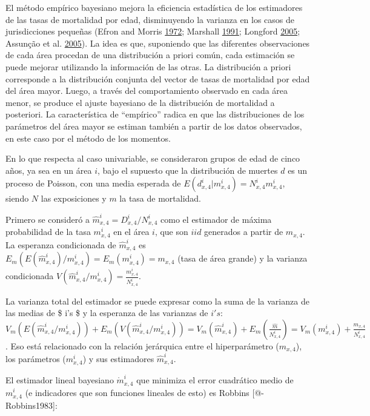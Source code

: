 \documentclass[12pt,]{article}
\begin{document}
El método empírico bayesiano mejora la eficiencia estadística de los
estimadores de las tasas de mortalidad por edad, disminuyendo la
varianza en los casos de jurisdicciones pequeñas (Efron and Morris
\protect\hyperlink{ref-Efron1972}{1972}; Marshall
\protect\hyperlink{ref-Marshall1991}{1991}; Longford
\protect\hyperlink{ref-Longford2005}{2005}; Assunção et al.
\protect\hyperlink{ref-Assuncao2005}{2005}). La idea es que, suponiendo
que las diferentes observaciones de cada área procedan de una
distribución a priori común, cada estimación se puede mejorar utilizando
la información de las otras. La distribución a priori corresponde a la
distribución conjunta del vector de tasas de mortalidad por edad del
área mayor. Luego, a través del comportamiento observado en cada área
menor, se produce el ajuste bayesiano de la distribución de mortalidad a
posteriori. La característica de ``empírico'' radica en que las
distribuciones de los parámetros del área mayor se estiman también a
partir de los datos observados, en este caso por el método de los
momentos.

En lo que respecta al caso univariable, se consideraron grupos de edad
de cinco años, ya sea en un área \(i\), bajo el supuesto que la
distribución de muertes \(d\) es un proceso de Poisson, con una media
esperada de \(E(d_ {x,4}^{i}|{m_{x,4}^{i}})=N_{x,4}^{i}m_{x,4}^{i}\),
siendo \(N\) las exposiciones y \(m\) la tasa de mortalidad.

Primero se consideró a \(\hat{m}_{x,4}^{i}=D_{x,4}^{i}/N_{x,4}^{i}\)
como el estimador de máxima probabilidad de la tasa \(m_{x,4}^{i}\) en
el área \(i\), que son \(iid\) generados a partir de \(m_{x,4}\). La
esperanza condicionada de \(\hat{m}_{x,4}^{i}\) es
\(E_{m}(E({\hat{m}}_{x,4}^{i})/m_{x,4}^{i})=E_{m}({m_{x, 4}^{i}}) = m_{x,4}\)
(tasa de área grande) y la varianza condicionada
\(V({\hat{m}}_{x,4}^{i}/m_{x,4}^{i})=\frac{m_{x,4}^{i}}{N_{x,4}^{i}}\).

La varianza total del estimador se puede expresar como la suma de la
varianza de las medias de \$ i's \$ y la esperanza de las varianzas de
\(i's\):
\(V_{m}(E(\hat{m}_{x,4}^{i}/m_{x,4}^{i}))+E_{m}(V({\hat{m}}_{x,4}^ {i}/m_{x,4}^{i}))=V_{m}(\hat{m}_{x,4}^{i})+E_{m}(\frac{{\hat{m}}}{N_{x,4}^{i}})=V_{m}(m_{x,4}^{i})+\frac{m_{x, 4}}{N_{x,4}^{i}}\).
Eso está relacionado con la relación jerárquica entre el hiperparámetro
(\(m_{x, 4}\)), los parámetros (\(m_{x,4}^{i}\)) y sus estimadores
\(\hat{m}_{x,4}^{i}\).

El estimador lineal bayesiano \(\mathring{m}_{x, 4}^{i}\) que minimiza
el error cuadrático medio de \({m}_{x,4}^{i}\) (e indicadores que son
funciones lineales de esto) es Robbins {[}@-Robbins1983{]}:
\end{document}
